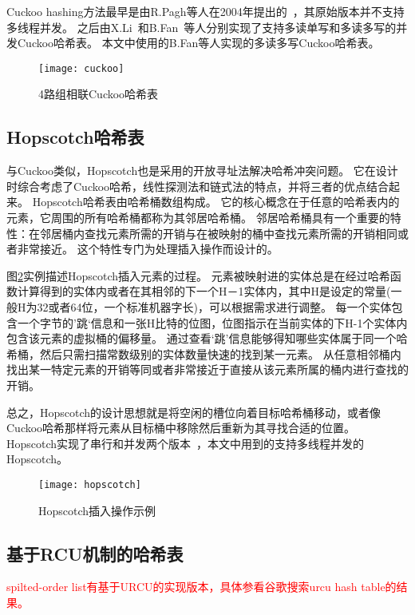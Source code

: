 Cuckoo hashing方法最早是由R.Pagh等人在2004年提出的~\cite{cuckoo-src}，其原始版本并不支持多线程并发。
之后由X.Li~\cite{memc3}和B.Fan~\cite{cuckoo}等人分别实现了支持多读单写和多读多写的并发Cuckoo哈希表。
本文中使用的B.Fan等人实现的多读多写Cuckoo哈希表。

\begin{figure}[htbp]
\centering
\texttt{[image: cuckoo]}
\caption{4路组相联Cuckoo哈希表}\label{fig:cuckoo}
\end{figure}

\subsection{Hopscotch哈希表}
与Cuckoo类似，Hopscotch也是采用的开放寻址法解决哈希冲突问题。
它在设计时综合考虑了Cuckoo哈希，线性探测法和链式法的特点，并将三者的优点结合起来。
Hopscotch哈希表由哈希桶数组构成。
它的核心概念在于任意的哈希表内的元素，它周围的所有哈希桶都称为其邻居哈希桶。
邻居哈希桶具有一个重要的特性：在邻居桶内查找元素所需的开销与在被映射的桶中查找元素所需的开销相同或者非常接近。
这个特性专门为处理插入操作而设计的。

图\ref{fig:hopscotch}实例描述Hopscotch插入元素的过程。
元素被映射进的实体总是在经过哈希函数计算得到的实体内或者在其相邻的下一个H－1实体内，其中H是设定的常量(一般H为32或者64位，一个标准机器字长)，可以根据需求进行调整。
每一个实体包含一个字节的’跳‘信息和一张H比特的位图，位图指示在当前实体的下H-1个实体内包含该元素的虚拟桶的偏移量。
通过查看‘跳’信息能够得知哪些实体属于同一个哈希桶，然后只需扫描常数级别的实体数量快速的找到某一元素。
从任意相邻桶内找出某一特定元素的开销等同或者非常接近于直接从该元素所属的桶内进行查找的开销。


总之，Hopscotch的设计思想就是将空闲的槽位向着目标哈希桶移动，或者像Cuckoo哈希那样将元素从目标桶中移除然后重新为其寻找合适的位置。
Hopscotch实现了串行和并发两个版本~\cite{hopscotch}，本文中用到的支持多线程并发的Hopscotch。

\begin{figure}[htbp]
\centering
\texttt{[image: hopscotch]}
\caption{Hopscotch插入操作示例}
\label{fig:hopscotch}
\end{figure}

\subsection{基于RCU机制的哈希表}

\textcolor{red}{spilted-order list有基于URCU的实现版本，具体参看谷歌搜索urcu hash table的结果。}


